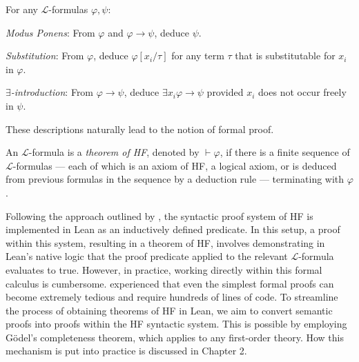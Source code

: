 \begin{definition}
    \label{def:prf.MP+prf.Subst+prf.ExIntro}
    For any $\mathcal{L}$-formulas $\varphi, \psi$:
    \begin{description}
        \item \textit{Modus Ponens}: 
        From $\varphi$ and $\varphi \rightarrow \psi$, deduce $\psi$.
        \item \textit{Substitution}:
        From $\varphi$, deduce $\varphi[x_i/\tau]$ for any term $\tau$ that is substitutable for
        $x_i$ in $\varphi$.
        \item \textit{$\exists$-introduction}:
        From $\varphi \rightarrow \psi$, deduce $\exists x_i \varphi \rightarrow \psi$ provided
        $x_i$ does not occur freely in $\psi$.
    \end{description}
\end{definition}

These descriptions naturally lead to the notion of formal proof.

\begin{definition}[Theorem of HF]
    \label{def:prf}
    An $\mathcal{L}$-formula is a \textit{theorem of HF}, denoted by $\vdash \varphi$, 
    if there is a finite sequence of $\mathcal{L}$-formulas — each of which is an axiom of HF, 
    a logical axiom, or is deduced from previous formulas in the sequence by a deduction rule —
    terminating with $\varphi$.
\end{definition}

Following the approach outlined by \cite{paulson2014machine}, 
the syntactic proof system of HF is implemented in Lean as an inductively defined predicate. 
In this setup, a proof within this system, resulting in a theorem of HF, 
involves demonstrating in Lean’s native logic that 
the proof predicate applied to the relevant $\mathcal{L}$-formula evaluates to true.
However, in practice, working directly within this formal calculus is cumbersome. 
\cite{paulson2014machine} experienced that even the simplest formal proofs can become extremely 
tedious and require hundreds of lines of code.
To streamline the process of obtaining theorems of HF in Lean, 
we aim to convert semantic proofs into proofs within the HF syntactic system. 
This is possible by employing Gödel's completeness theorem, which applies to any first-order theory.
How this mechanism is put into practice is discussed in Chapter 2.

